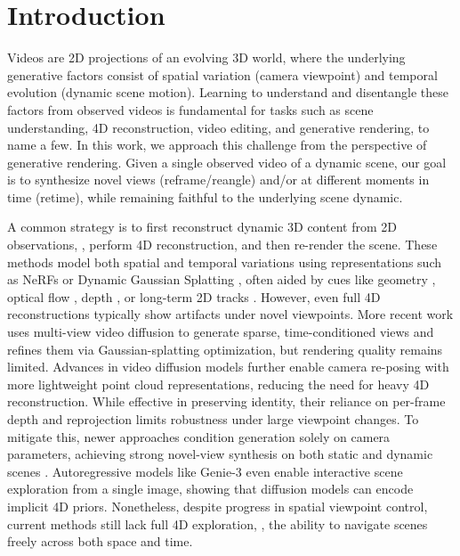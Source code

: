 \section{Introduction}
\label{sec:intro}

Videos are 2D projections of an evolving 3D world, where the underlying generative factors consist of spatial variation (camera viewpoint) and temporal evolution (dynamic scene motion). Learning to understand and disentangle these factors from observed videos is fundamental for tasks such as scene understanding, 4D reconstruction, video editing, and generative rendering, to name a few.  In this work, we approach this challenge from the perspective of generative rendering. Given a single observed video of a dynamic scene, our goal is to synthesize novel views (reframe/reangle) and/or at different moments in time (retime), while remaining faithful to the underlying scene dynamic. 

A common strategy is to first reconstruct dynamic 3D content from 2D observations, \ie, perform 4D reconstruction, and then re-render the scene. 
These methods model both spatial and temporal variations using representations such as NeRFs \cite{lin2024dynamic,mildenhall2021nerf} or Dynamic Gaussian Splatting \cite{kerbl20233d,wu20244d}, often aided by cues like geometry \cite{park2021hypernerf,park2021nerfies}, optical flow \cite{li2023dynibar,li2021nsff}, depth \cite{gao2021dynamic,yoon2020novel}, or long-term 2D tracks \cite{wang2024shapeofmotion,lei2024mosca}. However, even full 4D reconstructions typically show artifacts under novel viewpoints.
More recent work \cite{Wu2024, liang2024diffusion4d} uses multi-view video diffusion to generate sparse, time-conditioned views and refines them via Gaussian-splatting optimization, but rendering quality remains limited.
Advances in video diffusion models \cite{zhang2024show, wang2024lavie, blattmann2023stable, jeong2024track4gen, bar2024lumiere, videoworldsimulators2024, yang2024cogvideox, polyak2024moviegencastmedia, kong2024hunyuanvideo} further enable camera re-posing with more lightweight point cloud representations, reducing the need for heavy 4D reconstruction. While effective in preserving identity, their reliance on per-frame depth and reprojection limits robustness under large viewpoint changes. To mitigate this, newer approaches condition generation solely on camera parameters, achieving strong novel-view synthesis on both static \cite{jin2025lvsm} and dynamic scenes \cite{Bai2025,vanhoorick2024gcd,He2025}. 
Autoregressive models like Genie-3 \cite{parker-holder2025genie3} even enable interactive scene exploration from a single image, showing that diffusion models can encode implicit 4D priors. 
Nonetheless, despite progress in spatial viewpoint control, current methods still lack full 4D exploration, \ie, the ability to navigate scenes freely across both space and time.

